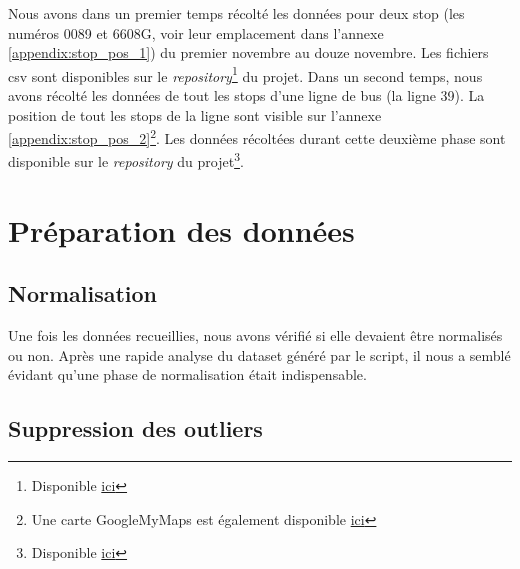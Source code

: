 \documentclass[12pt]{report}
\begin{document}
Nous avons dans un premier temps récolté les données pour deux stop (les numéros 0089 et 6608G, voir leur emplacement dans l'annexe \ref{appendix:stop_pos_1}) du premier novembre au douze novembre. Les fichiers csv sont disponibles sur le \textit{repository}\footnote{Disponible \href{https://github.com/jalbrecq/CanYouCatchIt/tree/main/sandbox/data/csv}{ici}} du projet. Dans un second temps, nous avons récolté les données de tout les stops d'une ligne de bus (la ligne 39). La position de tout les stops de la ligne sont visible sur l'annexe \ref{appendix:stop_pos_2}\footnote{Une carte GoogleMyMaps est également disponible \href{https://www.google.com/maps/d/edit?mid=1_qNGPUfuZXrqC3UZXkmDOWuhEHJfYAox&usp=sharing}{ici}}. Les données récoltées durant cette deuxième phase sont disponible sur le \textit{repository} du projet\footnote{Disponible \href{https://github.com/jalbrecq/CanYouCatchIt/tree/main/sandbox/data/csv2}{ici}}.

\section{Préparation des données}

\subsection{Normalisation}
Une fois les données recueillies, nous avons vérifié si elle devaient être normalisés ou non. Après une rapide analyse du dataset généré par le script, il nous a semblé évidant qu'une phase de normalisation était indispensable.

\subsection{Suppression des outliers}
\end{document}
